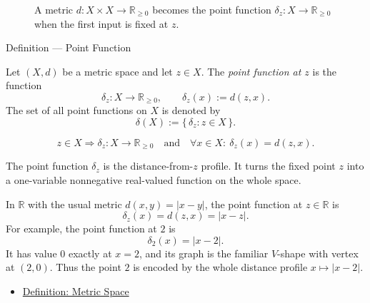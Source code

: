 \begin{figure}[htbp]
\centering

\caption{A metric \(d:X\times X\to\mathbb{R}_{\geq 0}\) becomes the point
function \(\delta_z:X\to\mathbb{R}_{\geq 0}\) when the first input is fixed at
\(z\).}
\label{fig:point-function-freezes-metric}
\end{figure}

\begin{definitionbox}{Definition --- Point Function}
\begin{definition}\label{def:metric-point-function}
Let \((X,d)\) be a metric space and let \(z\in X\).  The
\emph{point function at \(z\)} is the function
\[
  \delta_z:X\to\mathbb{R}_{\geq 0},
  \qquad
  \delta_z(x):=d(z,x).
\]
The set of all point functions on \(X\) is denoted by
\[
  \delta(X):=\{\,\delta_z:z\in X\,\}.
\]
\end{definition}
\end{definitionbox}


\begin{remark*}
\[
z\in X
\Longrightarrow
\delta_z:X\to\mathbb{R}_{\geq 0}
\quad\text{and}\quad
\forall x\in X{:}\ \delta_z(x)=d(z,x).
\]
\end{remark*}

\begin{remark*}[Interpretation]
The point function \(\delta_z\) is the distance-from-\(z\) profile.  It turns
the fixed point \(z\) into a one-variable nonnegative real-valued function on
the whole space.
\end{remark*}

\begin{remark*}[Examples]
In \(\mathbb{R}\) with the usual metric \(d(x,y)=|x-y|\), the point function
at \(z\in\mathbb{R}\) is
\[
  \delta_z(x)=d(z,x)=|x-z|.
\]
For example, the point function at \(2\) is
\[
  \delta_2(x)=|x-2|.
\]
It has value \(0\) exactly at \(x=2\), and its graph is the familiar
\(V\)-shape with vertex at \((2,0)\).  Thus the point \(2\) is encoded by the
whole distance profile \(x\mapsto |x-2|\).
\end{remark*}

\begin{dependencies}
\begin{itemize}
  \item \hyperref[def:metric-space]{Definition: Metric Space}
\end{itemize}
\end{dependencies}

